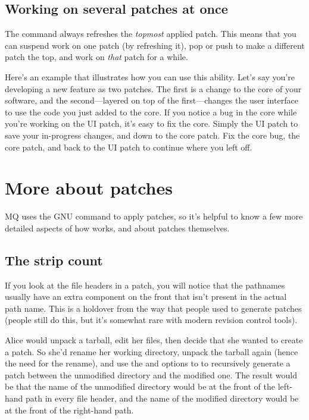 \subsection{Working on several patches at once}

The  command always refreshes the \emph{topmost}
applied patch.  This means that you can suspend work on one patch (by
refreshing it), pop or push to make a different patch the top, and
work on \emph{that} patch for a while.

Here's an example that illustrates how you can use this ability.
Let's say you're developing a new feature as two patches.  The first
is a change to the core of your software, and the second---layered on
top of the first---changes the user interface to use the code you just
added to the core.  If you notice a bug in the core while you're
working on the UI patch, it's easy to fix the core.  Simply
 the UI patch to save your in-progress changes, and
 down to the core patch.  Fix the core bug,
 the core patch, and  back to the UI
patch to continue where you left off.

\section{More about patches}
\label{sec:mq:adv-patch}

MQ uses the GNU  command to apply patches, so it's
helpful to know a few more detailed aspects of how 
works, and about patches themselves.

\subsection{The strip count}

If you look at the file headers in a patch, you will notice that the
pathnames usually have an extra component on the front that isn't
present in the actual path name.  This is a holdover from the way that
people used to generate patches (people still do this, but it's
somewhat rare with modern revision control tools).  

Alice would unpack a tarball, edit her files, then decide that she
wanted to create a patch.  So she'd rename her working directory,
unpack the tarball again (hence the need for the rename), and use the
 and  options to  to
recursively generate a patch between the unmodified directory and the
modified one.  The result would be that the name of the unmodified
directory would be at the front of the left-hand path in every file
header, and the name of the modified directory would be at the front
of the right-hand path.

